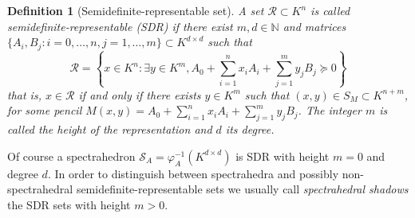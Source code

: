 \documentclass[a4paper,oneside,10pt]{article}
\newtheorem{definition}[theorem]{Definition}
\newcommand{\N}{\mathbb{N}} %
\begin{document}
\begin{definition}[Semidefinite-representable set]\label{def_semi_def_rep_set}
  A set $\mathcal{R} \subset K^n$ is called
  \emph{semide\-fi\-nite-re\-pre\-sen\-ta\-ble (SDR)} if there exist $m,d \in \N$ and
  matrices $\{A_i,B_j : i = 0, \ldots, n, j = 1, \ldots, m\} \subset K^{d \times d}$ such that
  $$
  \mathcal{R} = \left\{x \in K^n : \exists y \in K^m, A_0+\sum_{i=1}^n x_iA_i + \sum_{j=1}^m y_jB_j \succeq 0\right\}
  $$
  that is, $x \in \mathcal{R}$ if and only if there exists $y \in K^m$ such that
  $(x,y) \in S_M \subset K^{n+m}$, for some pencil $M(x,y) = A_0+\sum_{i=1}^n x_iA_i + \sum_{j=1}^m y_jB_j$.
  The integer $m$ is called the \emph{height} of the representation and $d$ its \emph{degree}.
\end{definition}

Of course a spectrahedron $\mathcal{S}_A = \varphi_A^{-1}(K^{d \times d})$ is SDR with height $m=0$ and degree
$d$. In order to distinguish between spectrahedra and possibly non-spectrahedral semidefinite-representable sets
we usually call \emph{spectrahedral shadows} the SDR sets with height $m>0$.
\end{document}
